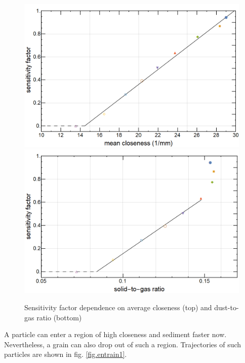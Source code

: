 \begin{figure}[h]
\includegraphics[width=\columnwidth]{sense1.png}
\includegraphics[width=\columnwidth]{sense2.png}
    \caption{\label{fig.sensitive1} Sensitivity factor dependence on average closeness (top) and dust-to-gas ratio (bottom)}
\end{figure}

A particle can enter a region of high closeness and sediment faster now. Nevertheless, a grain can also drop out of such a region. 
Trajectories of such particles are shown in fig. \ref{fig.entrain1}.

